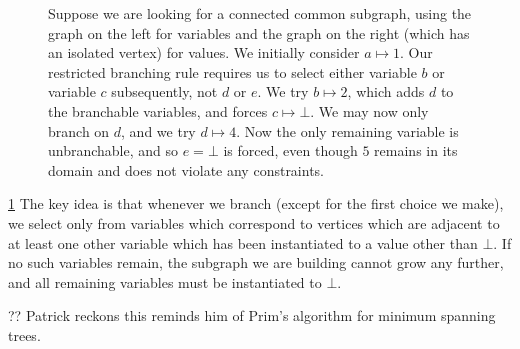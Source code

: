 \documentclass{llncs}
\begin{document}
\begin{figure}[tb]

    \caption{Suppose we are looking for a connected common subgraph, using the graph on the left
        for variables and the graph on the right (which has an isolated vertex) for values. We
        initially consider $a \mapsto 1$. Our restricted branching rule requires us to select either variable
        $b$ or variable $c$ subsequently, not $d$ or $e$. We try $b \mapsto 2$, which adds $d$
        to the branchable variables, and forces $c \mapsto \bot$. We may now only branch on $d$, and
        we try $d \mapsto 4$. Now the only remaining variable is unbranchable, and so $e = \bot$ is forced, even
        though $5$ remains in its domain and does not violate any constraints.}\label{figure:restricted}
\end{figure}

\cref{figure:restricted} The key idea is that whenever we branch (except for the first choice we
make), we select only from variables which correspond to vertices which are adjacent to at least one
other variable which has been instantiated to a value other than $\bot$. If no such variables
remain, the subgraph we are building cannot grow any further, and all remaining variables must be
instantiated to $\bot$.

?? Patrick reckons this reminds him of Prim's algorithm for minimum spanning trees.
\end{document}
